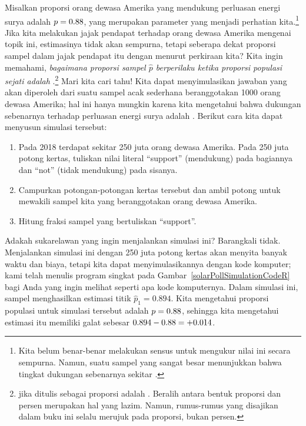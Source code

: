 Misalkan proporsi orang dewasa Amerika yang mendukung
perluasan energi surya adalah $p = 0.88{}$,
yang merupakan parameter yang menjadi perhatian kita.\footnote{Kita belum
  benar-benar melakukan sensus untuk mengukur nilai ini secara sempurna.
  Namun, suatu sampel yang sangat besar menunjukkan bahwa tingkat
  dukungan sebenarnya sekitar \pewsolarparpercent{}.}
Jika kita melakukan jajak pendapat terhadap \pewsolarpollsize{} orang dewasa Amerika
mengenai topik ini, estimasinya tidak akan sempurna,
tetapi seberapa dekat proporsi sampel dalam jajak pendapat itu
dengan \pewsolarparpercent{} menurut perkiraan kita?
Kita ingin memahami, \emph{bagaimana
proporsi sampel $\hat{p}$ berperilaku ketika proporsi populasi sejati
adalah
\pewsolarparprop{}}.\footnote{\pewsolarparpercent{}
  jika ditulis sebagai proporsi adalah
  \pewsolarparprop{}.
  Beralih antara bentuk proporsi dan persen merupakan hal yang lazim.
  Namun, rumus-rumus yang disajikan dalam buku ini selalu merujuk
  pada proporsi, bukan persen.}
Mari kita cari tahu!
Kita dapat menyimulasikan jawaban yang akan diperoleh dari suatu sampel
acak sederhana beranggotakan 1000 orang dewasa Amerika;
hal ini hanya mungkin karena kita mengetahui bahwa dukungan sebenarnya
terhadap perluasan energi surya adalah \pewsolarparprop{}.
%
%
%
Berikut cara kita dapat menyusun simulasi tersebut:
\begin{enumerate}
\item Pada 2018 terdapat sekitar 250 juta orang dewasa Amerika.
    Pada 250 juta potong kertas, tuliskan nilai literal ``support'' (mendukung)
    pada \pewsolarparpercent{} bagiannya dan ``not'' (tidak mendukung) pada
    \pewsolarparpercentcomplement{} sisanya.
\item Campurkan potongan-potongan kertas tersebut dan ambil \pewsolarpollsize{}
    potong untuk mewakili sampel kita yang beranggotakan \pewsolarpollsize{}
    orang dewasa Amerika.
\item Hitung fraksi sampel yang bertuliskan ``support''.
\end{enumerate}
Adakah sukarelawan yang ingin menjalankan simulasi ini? Barangkali tidak. Menjalankan
simulasi ini dengan 250 juta potong kertas akan menyita banyak waktu dan
biaya, tetapi kita dapat menyimulasikannya
dengan kode komputer; kami telah menulis program singkat pada
Gambar~\ref{solarPollSimulationCodeR}
bagi Anda yang ingin melihat seperti apa kode komputernya.
Dalam simulasi ini, sampel menghasilkan estimasi titik
$\hat{p}_1 = 0.894$. Kita mengetahui proporsi populasi
untuk simulasi tersebut adalah $p = 0.88{}$, sehingga kita mengetahui
estimasi itu memiliki galat sebesar
$0.894 - 0.88{} = \text{+0.014}$.

